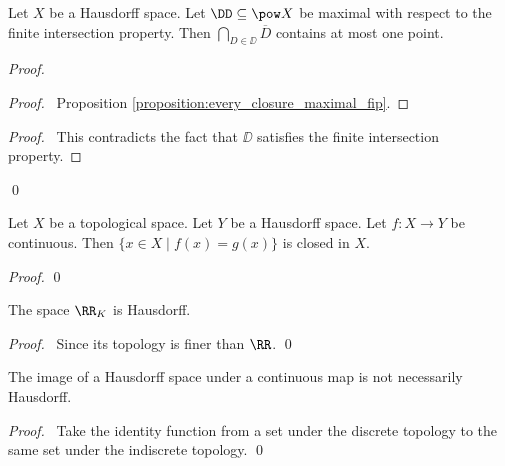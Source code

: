 \begin{proposition}
    Let $X$ be a Hausdorff space. Let $\DD \subseteq \pow X$ be maximal
    with respect to the finite intersection property. Then $\bigcap_{D \in \DD}
    \overline{D}$ contains at most one point.
\end{proposition}

\begin{proof}
    \pf
    \begin{proof}
        \pf\ Proposition \ref{proposition:every_closure_maximal_fip}.
    \end{proof}
    \qedstep
    \begin{proof}
        \pf\ This contradicts the fact that $\DD$ satisfies the finite intersection property.
    \end{proof}
    \qed
\end{proof}

\begin{proposition}
    Let $X$ be a topological space. Let $Y$ be a Hausdorff space. Let $f : X
    \rightarrow Y$ be continuous. Then $\{ x \in X \mid f(x) = g(x) \}$
    is closed in $X$.
\end{proposition}

\begin{proof}
    \pf
    \qed
\end{proof}

\begin{proposition}
    The space $\RR_K$ is Hausdorff.
\end{proposition}

\begin{proof}
    \pf\ Since its topology is finer than $\RR$. \qed
\end{proof}

\begin{proposition}
    The image of a Hausdorff space under a continuous map is
    not necessarily Hausdorff.
\end{proposition}

\begin{proof}
    \pf\ Take the identity function from a set under the
    discrete topology to the same set under the indiscrete topology. \qed
\end{proof}

